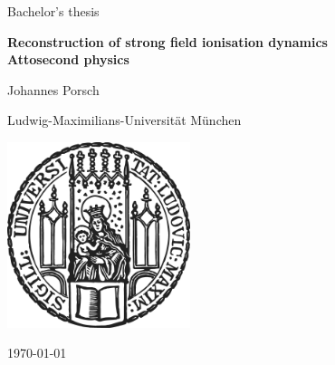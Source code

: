 \begin{titlepage}
    \centering
    
    {\Large Bachelor's thesis}
    
    \vspace{1.5cm}
    
    {\huge\bfseries Reconstruction of strong field ionisation dynamics\\[0.4cm]
    \Large Attosecond physics}
    
    \vspace{2cm}
    
    {\Large Johannes Porsch}
    
    \vspace{2cm}
    
    {\Large Ludwig-Maximilians-Universität München}
    
    \vfill

    \includegraphics[width = 0.4\textwidth]{figures/sigillum.png}

    \vfill
    
    {\Large \today}
    
\end{titlepage}